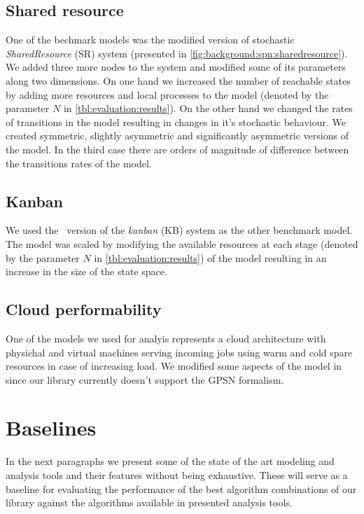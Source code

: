 \subsection{Shared resource}

One of the bechmark models was the modified version of stochastic \emph{SharedResource} (SR) system (presented in \cref{fig:background:spn:sharedresource}). We added three more nodes to the system and modified some of its parameters along two dimensions. On one hand we increased the number of reachable states by adding more resources and local processes to the model (denoted by the parameter $N$ in \cref{tbl:evaluation:results}). On the other hand we changed the rates of transitions in the model resulting in changes in it's stochastic  behaviour. We created symmetric, slightly asymmetric and significantly asymmetric versions of the model. In the third case there are orders of magnitude of difference between the transitions rates of the model.  

\subsection{Kanban}

We used the \SPN\ version of the \emph{kanban} (KB) system \citep{ciardo2003logical} as the other benchmark model. The model was scaled by modifying the available resources at each stage (denoted by the parameter $N$ in \cref{tbl:evaluation:results}) of the model resulting in an increase in the size of the state space.

\subsection{Cloud performability}

One of the models we used for analyis represents a cloud architecture \citep{ghosh2012scalable} with physichal and virtual machines serving incoming jobs using warm and cold spare resources in case of increasing load. We modified some aspects of the model in \citep{ghosh2012scalable} since our library currently doesn't support the GPSN formalism.

\section{Baselines}

In the next paragraphs we present some of the state of the art modeling and analysis tools and their features without being exhaustive. These will serve as a baseline for evaluating the performance of the best algorithm combinations of our library against the algorithms available in presented analysis tools.

